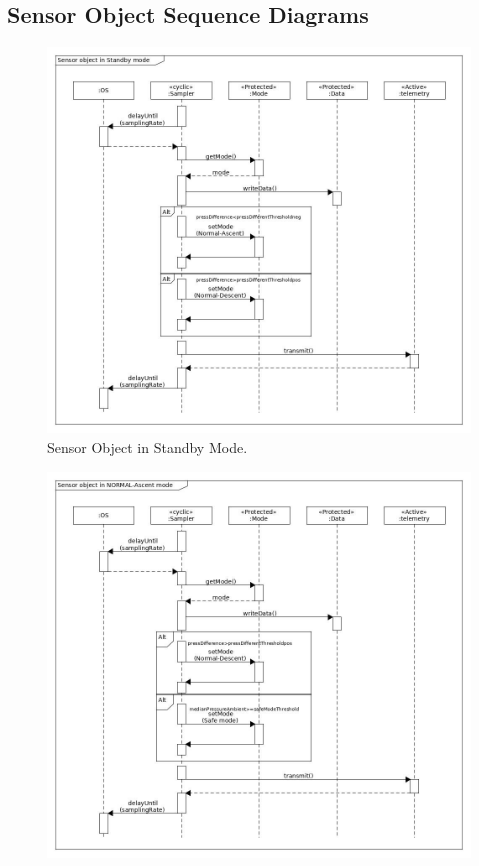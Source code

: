 \documentclass[a4paper,12pt,oneside]{article} %
\providecommand{\DIFaddbeginFL}{} %
\providecommand{\DIFaddendFL}{} %
\providecommand{\DIFdelbeginFL}{} %
\providecommand{\DIFdelendFL}{} %
\newcommand{\DIFscaledelfig}{0.5}
\newlength{\DIFdelgraphicswidth} %
\newlength{\DIFdelgraphicsheight} %
\newcommand{\DIFaddincludegraphics}[2][]{{\color{blue}\fbox{\DIFOincludegraphics[#1]{#2}}}} %
\newcommand{\DIFdelincludegraphics}[2][]{%
\sbox{\DIFdelgraphicsbox}{\DIFOincludegraphics[#1]{#2}}%
\settoboxwidth{\DIFdelgraphicswidth}{\DIFdelgraphicsbox} %
\settoboxtotalheight{\DIFdelgraphicsheight}{\DIFdelgraphicsbox} %
\scalebox{\DIFscaledelfig}{%
\parbox[b]{\DIFdelgraphicswidth}{\usebox{\DIFdelgraphicsbox}\\[-\baselineskip] \rule{\DIFdelgraphicswidth}{0em}}\llap{\resizebox{\DIFdelgraphicswidth}{\DIFdelgraphicsheight}{%
\setlength{\unitlength}{\DIFdelgraphicswidth}%
\begin{picture}(1,1)%
\thicklines\linethickness{2pt} %
{\color[rgb]{1,0,0}\put(0,0){\framebox(1,1){}}}%
{\color[rgb]{1,0,0}\put(0,0){\line( 1,1){1}}}%
{\color[rgb]{1,0,0}\put(0,1){\line(1,-1){1}}}%
\end{picture}%
}\hspace*{3pt}}} %
} %
\DeclareRobustCommand{\DIFaddbeginFL}{\DIFOaddbeginFL \let\includegraphics\DIFaddincludegraphics} %
\DeclareRobustCommand{\DIFaddendFL}{\DIFOaddendFL \let\includegraphics\DIFOincludegraphics} %
\DeclareRobustCommand{\DIFdelbeginFL}{\DIFOdelbeginFL \let\includegraphics\DIFdelincludegraphics} %
\DeclareRobustCommand{\DIFdelendFL}{\DIFOaddendFL \let\includegraphics\DIFOincludegraphics} %
\begin{document}
\begin{appendices}
\begin{landscape}
\subsection{Sensor Object Sequence Diagrams}
\begin{figure}[H]
    \centering
    \DIFdelbeginFL %
\DIFdelendFL %
    \DIFaddbeginFL \includegraphics[height=0.8\textwidth]{appendix/img/softwareDiagrams/Sequance-Diagram-standby-Mode.jpg}
    \DIFaddendFL \caption{Sensor Object in Standby Mode.}
    \label{sensora}
\end{figure}
\begin{figure}[H]
    \centering
    \DIFdelbeginFL %
\DIFdelendFL \DIFaddbeginFL \includegraphics[height=0.9\textwidth]{appendix/img/softwareDiagrams/Sequance-Diagram ascent-Mode.jpg}

\end{figure}
\end{landscape}
\end{appendices}
\end{document}
